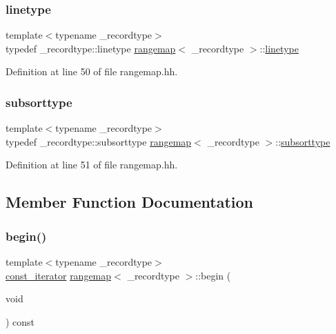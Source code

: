\subsubsection{\texorpdfstring{linetype}{linetype}}
{\footnotesize\ttfamily template$<$typename \+\_\+recordtype$>$ \\
typedef \+\_\+recordtype\+::linetype \mbox{\hyperlink{classrangemap}{rangemap}}$<$ \+\_\+recordtype $>$\+::\mbox{\hyperlink{classrangemap_a54c8f7622f9af4c4232d764cf9ed11fa}{linetype}}}



Definition at line 50 of file rangemap.\+hh.

\mbox{\label{classrangemap_aeef55d9063b5d89e075229fad91ea631}} 
\subsubsection{\texorpdfstring{subsorttype}{subsorttype}}
{\footnotesize\ttfamily template$<$typename \+\_\+recordtype$>$ \\
typedef \+\_\+recordtype\+::subsorttype \mbox{\hyperlink{classrangemap}{rangemap}}$<$ \+\_\+recordtype $>$\+::\mbox{\hyperlink{classrangemap_aeef55d9063b5d89e075229fad91ea631}{subsorttype}}}



Definition at line 51 of file rangemap.\+hh.



\subsection{Member Function Documentation}
\mbox{\label{classrangemap_a8c2bf606a25b684284656382be0ba469}} 
\subsubsection{\texorpdfstring{begin()}{begin()}}
{\footnotesize\ttfamily template$<$typename \+\_\+recordtype$>$ \\
\mbox{\hyperlink{classrangemap_affa7462e68d053d3a066fe0b8d46a99d}{const\+\_\+iterator}} \mbox{\hyperlink{classrangemap}{rangemap}}$<$ \+\_\+recordtype $>$\+::begin (\begin{DoxyParamCaption}\item[{void}]{ }\end{DoxyParamCaption}) const\hspace{0.3cm}{\ttfamily [inline]}}



